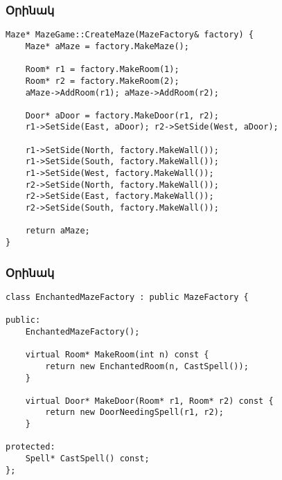 \documentclass{beamer}
\begin{document}
\begin{frame}[fragile]\frametitle{Օրինակ}
\begin{english}
\begin{verbatim}
Maze* MazeGame::CreateMaze(MazeFactory& factory) {
    Maze* aMaze = factory.MakeMaze();

    Room* r1 = factory.MakeRoom(1);
    Room* r2 = factory.MakeRoom(2);
    aMaze->AddRoom(r1); aMaze->AddRoom(r2);

    Door* aDoor = factory.MakeDoor(r1, r2);
    r1->SetSide(East, aDoor); r2->SetSide(West, aDoor);

    r1->SetSide(North, factory.MakeWall());
    r1->SetSide(South, factory.MakeWall());
    r1->SetSide(West, factory.MakeWall());
    r2->SetSide(North, factory.MakeWall());
    r2->SetSide(East, factory.MakeWall());
    r2->SetSide(South, factory.MakeWall());

    return aMaze;
}
\end{verbatim}
\end{english}
\end{frame}

\begin{frame}[fragile]\frametitle{Օրինակ}
\begin{english}
\begin{verbatim}
class EnchantedMazeFactory : public MazeFactory {

public:
    EnchantedMazeFactory();

    virtual Room* MakeRoom(int n) const {
        return new EnchantedRoom(n, CastSpell());
    }

    virtual Door* MakeDoor(Room* r1, Room* r2) const {
        return new DoorNeedingSpell(r1, r2);
    }

protected:
    Spell* CastSpell() const;
};
\end{verbatim}
\end{english}
\end{frame}
\end{document}
